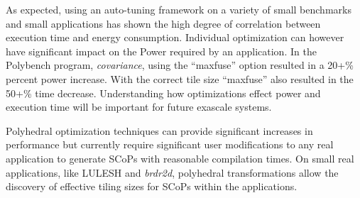 As expected, using an auto-tuning framework on a variety of
small benchmarks and small applications has shown the high
degree of correlation between execution time and energy
consumption. Individual optimization can however
have significant impact on the Power required by an
application. In the Polybench program, \emph{covariance},
using the ``maxfuse'' option resulted in a 20+\% percent power
increase. With the correct tile size ``maxfuse'' also
resulted in the 50+\% time decrease. Understanding
how optimizations effect power and execution time 
will be important for future exascale systems.

Polyhedral optimization techniques can provide significant 
increases in performance but currently require 
significant user modifications to any real application
to generate SCoPs with reasonable compilation times.
On small real applications, like LULESH and \emph{brdr2d},
polyhedral transformations allow the discovery of
effective tiling sizes for SCoPs within the applications.
